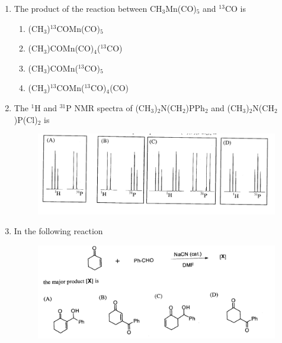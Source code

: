 \documentclass[journal,12pt,onecolumn]{IEEEtran}
\theoremstyle{remark}
\begin{document}
\begin{enumerate}
\item    \hspace{0.5cm} The product of the reaction between CH$_3$Mn(CO)$_5$ and $^{13}$CO is  \hfill{}

\begin{multicols}{2}
\begin{enumerate}
    \item (CH$_3$)$^{13}$COMn(CO)$_5$
    \item (CH$_3$)COMn(CO)$_4$($^{13}$CO)
    \item (CH$_3$)COMn($^{13}$CO)$_5$
    \item (CH$_3$)$^{13}$COMn($^{13}$CO)$_4$(CO)
\end{enumerate}
\end{multicols}
 

\item    \hspace{0.5cm} The $^1$H and $^{31}$P NMR spectra of (CH$_3$)$_2$N(CH$_2$)PPh$_2$ and (CH$_3$)$_2$N(CH$_2$)P(Cl)$_2$ is  \hfill{}

\begin{figure}
    \centering
    \includegraphics[width=\linewidth]{figs/image11.png}
    \caption{}
    \label{fig:figure11}
\end{figure}
 

\item    \hspace{0.5cm} In the following reaction  \hfill{}

\begin{figure}
    \centering
    \includegraphics[width=\textwidth]{figs/image12.png}
    \caption{}
    \label{fig:figure12}
\end{figure}


\end{enumerate}
\end{document}
